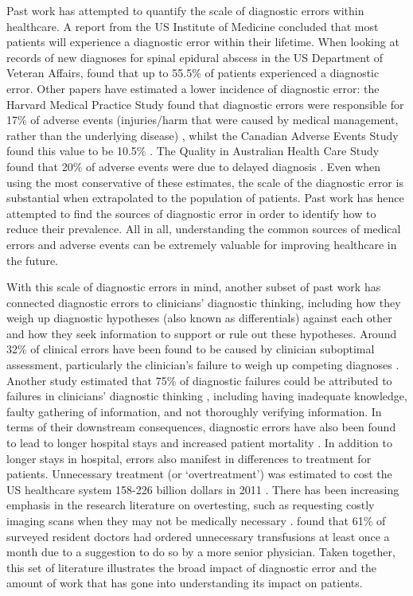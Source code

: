 \documentclass[a4paper, nobind]{templates/ociamthesis}
\begin{document}
\hfill\break
Past work has attempted to quantify the scale of diagnostic errors within healthcare. A report from the US Institute of Medicine concluded that most patients will experience a diagnostic error within their lifetime. When looking at records of new diagnoses for spinal epidural abscess in the US Department of Veteran Affairs, \autocite{bhise_errors_2017} found that up to 55.5\% of patients experienced a diagnostic error. Other papers have estimated a lower incidence of diagnostic error: the Harvard Medical Practice Study found that diagnostic errors were responsible for 17\% of adverse events (injuries/harm that were caused by medical management, rather than the underlying disease) \autocite{kohn_errors_2000}, whilst the Canadian Adverse Events Study found this value to be 10.5\% \autocite{baker_canadian_2004}. The Quality in Australian Health Care Study found that 20\% of adverse events were due to delayed diagnosis \autocite{wilson_analysis_1999}. Even when using the most conservative of these estimates, the scale of the diagnostic error is substantial when extrapolated to the population of patients. Past work has hence attempted to find the sources of diagnostic error in order to identify how to reduce their prevalence. All in all, understanding the common sources of medical errors and adverse events can be extremely valuable for improving healthcare in the future.

\hfill\break
With this scale of diagnostic errors in mind, another subset of past work has connected diagnostic errors to clinicians' diagnostic thinking, including how they weigh up diagnostic hypotheses (also known as differentials) against each other and how they seek information to support or rule out these hypotheses. Around 32\% of clinical errors have been found to be caused by clinician suboptimal assessment, particularly the clinician's failure to weigh up competing diagnoses \autocite{schiff_diagnostic_2009}. Another study estimated that 75\% of diagnostic failures could be attributed to failures in clinicians' diagnostic thinking \autocite{thammasitboon_diagnostic_2013}, including having inadequate knowledge, faulty gathering of information, and not thoroughly verifying information. In terms of their downstream consequences, diagnostic errors have also been found to lead to longer hospital stays and increased patient mortality \autocite{hautz_diagnostic_2019}. In addition to longer stays in hospital, errors also manifest in differences to treatment for patients. Unnecessary treatment (or `overtreatment') was estimated to cost the US healthcare system 158-226 billion dollars in 2011 \autocite{berwick_eliminating_2012}. There has been increasing emphasis in the research literature on overtesting, such as requesting costly imaging scans when they may not be medically necessary \autocite{carpenter_overtesting_2015}. \textcite{salem-schatz_influence_1990} found that 61\% of surveyed resident doctors had ordered unnecessary transfusions at least once a month due to a suggestion to do so by a more senior physician. Taken together, this set of literature illustrates the broad impact of diagnostic error and the amount of work that has gone into understanding its impact on patients.
\end{document}
